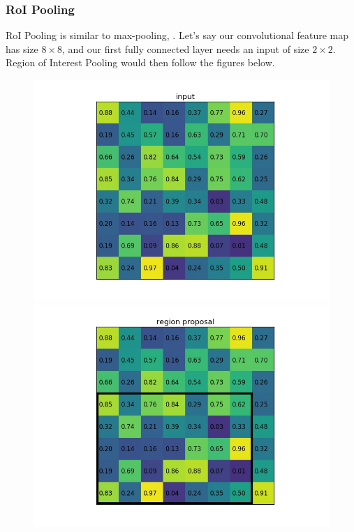 \subsubsection{RoI Pooling}\label{s:roi-pooling}

RoI Pooling is similar to max-pooling, . Let's say our convolutional feature map has size $8\times8$, and our first fully connected layer needs an input of size $2\times2$. Region of Interest Pooling would then follow the figures below.

\begin{figure}[htbp]
	\centering
	\begin{minipage}{0.5\textwidth}
		\centering
		\includegraphics[width=1.1\textwidth]{images/roipool1.jpg} %
	\end{minipage}\hfill
	\begin{minipage}{0.5\textwidth}
		\centering
		\includegraphics[width=1.1\textwidth]{images/roipool2.jpg} %
	\end{minipage}
\end{figure}

